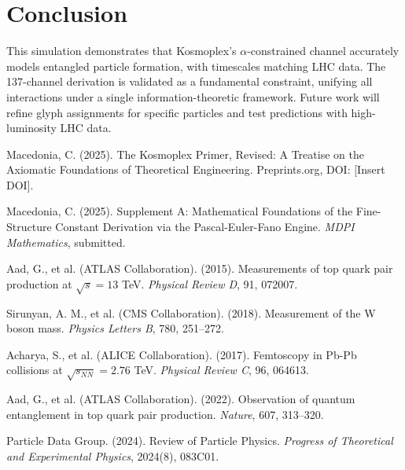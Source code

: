 \documentclass[12pt]{article}
\theoremstyle{definition}
\begin{document}
\section{Conclusion}
This simulation demonstrates that Kosmoplex’s $\alpha$-constrained channel accurately models entangled particle formation, with timescales matching LHC data. The 137-channel derivation is validated as a fundamental constraint, unifying all interactions under a single information-theoretic framework. Future work will refine glyph assignments for specific particles and test predictions with high-luminosity LHC data.

\begin{thebibliography}{10}
Macedonia, C. (2025). The Kosmoplex Primer, Revised: A Treatise on the Axiomatic Foundations of Theoretical Engineering. Preprints.org, DOI: [Insert DOI].

Macedonia, C. (2025). Supplement A: Mathematical Foundations of the Fine-Structure Constant Derivation via the Pascal-Euler-Fano Engine. \textit{MDPI Mathematics}, submitted.

Aad, G., et al. (ATLAS Collaboration). (2015). Measurements of top quark pair production at $\sqrt{s} = 13$ TeV. \textit{Physical Review D}, 91, 072007.

Sirunyan, A. M., et al. (CMS Collaboration). (2018). Measurement of the W boson mass. \textit{Physics Letters B}, 780, 251--272.

Acharya, S., et al. (ALICE Collaboration). (2017). Femtoscopy in Pb-Pb collisions at $\sqrt{s_{NN}} = 2.76$ TeV. \textit{Physical Review C}, 96, 064613.

Aad, G., et al. (ATLAS Collaboration). (2022). Observation of quantum entanglement in top quark pair production. \textit{Nature}, 607, 313--320.

Particle Data Group. (2024). Review of Particle Physics. \textit{Progress of Theoretical and Experimental Physics}, 2024(8), 083C01.
\end{thebibliography}
\end{document}
